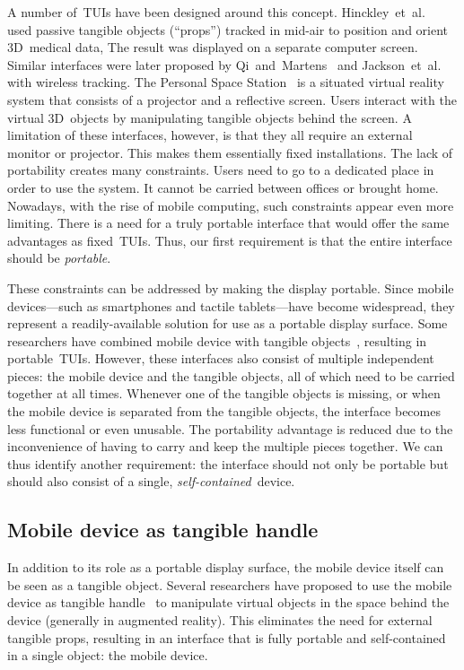 \documentclass{vgtc}                         \havecopyrightspacefalse
\begin{document}
A number of~TUIs have been designed around this concept. Hinckley~et~al.~\cite{hinckley94} used passive tangible objects (``props'') tracked in mid-air to position and orient 3D~medical data, The result was displayed on a separate computer screen. Similar interfaces were later proposed by Qi~and~Martens~\cite{qi05} and Jackson~et~al.~\cite{jackson13} with wireless tracking. The Personal Space Station~\cite{mulder02} is a situated virtual reality system that consists of a projector and a reflective screen. Users interact with the virtual 3D~objects by manipulating tangible objects behind the screen. A limitation of these interfaces, however, is that they all require an external monitor or projector. This makes them essentially fixed installations. The lack of portability creates many constraints. Users need to go to a dedicated place in order to use the system. It cannot be carried between offices or brought home. Nowadays, with the rise of mobile computing, such constraints appear even more limiting. There is a need for a truly portable interface that would offer the same advantages as fixed~TUIs. Thus, our first requirement is that the entire interface should be \emph{portable}.

These constraints can be addressed by making the display portable. Since mobile devices---such as smartphones and tactile tablets---have become widespread, they represent a readily-available solution for use as a portable display surface. Some researchers have combined mobile device with tangible objects~\cite{avrahami11,issartel14-2,liang13}, resulting in portable~TUIs. However, these interfaces also consist of multiple independent pieces: the mobile device and the tangible objects, all of which need to be carried together at all times. Whenever one of the tangible objects is missing, or when the mobile device is separated from the tangible objects, the interface becomes less functional or even unusable. The portability advantage is reduced due to the inconvenience of having to carry and keep the multiple pieces together. We can thus identify another requirement: the interface should not only be portable but should also consist of a single, \emph{self-contained}~device.

\subsection{Mobile device as tangible handle}

In addition to its role as a portable display surface, the mobile device itself can be seen as a tangible object. Several researchers have proposed to use the mobile device as tangible handle~\cite{henrysson05,marzo14,mossel13} to manipulate virtual objects in the space behind the device (\mbox{generally} in augmented reality). This eliminates the need for external tangible props, resulting in an interface that is fully portable and self-contained in a single object: the mobile device.
\end{document}

